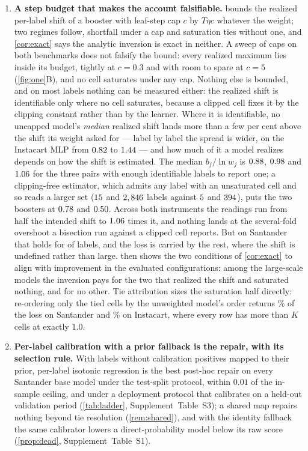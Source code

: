 \documentclass[sigconf,nonacm]{acmart}
\newcommand{\Supp}[1]{Supplement~#1}  %
\begin{document}
\begin{enumerate}[leftmargin=*,nosep]
\item \textbf{A step budget that makes the account falsifiable.}  bounds the realized per-label shift of a booster with leaf-step cap $c$ by $T\eta c$ whatever the weight; two regimes follow, shortfall under a cap and saturation ties without one, and \cref{cor:exact} says the analytic inversion is exact in neither. A sweep of \ncapN{} caps on both benchmarks does not falsify the bound: every realized maximum lies inside its budget, tightly at $c=0.3$ and with room to spare at $c=5$ (\cref{fig:one}B), and no cell saturates under any cap. Nothing else is bounded, and on most labels nothing can be measured either: the realized shift is identifiable only where no cell saturates, because a clipped cell fixes it by the clipping constant rather than by the learner. Where it is identifiable, no uncapped model's \emph{median} realized shift lands more than a few per cent above the shift its weight asked for --- label by label the spread is wider, on the Instacart MLP from $0.82$ to $1.44$ --- and how much of it a model realizes depends on how the shift is estimated. The median $b_j/\ln w_j$ is $0.88$, $0.98$ and $1.06$ for the three pairs with enough identifiable labels to report one; a clipping-free estimator, which admits any label with an unsaturated cell and so reads a larger set ($15$ and $2,846$ labels against $5$ and $394$), puts the two boosters at $0.78$ and $0.50$. Across both instruments the readings run from half the intended shift to $1.06$ times it, and nothing lands at the several-fold overshoot a bisection run against a clipped cell reports. But on Santander that holds for \nSnIdentShift{} of \nnLabels{} labels, and the loss is carried by the rest, where the shift is undefined rather than large.  then shows the two conditions of \cref{cor:exact} to align with improvement in the evaluated configurations: among the large-scale models the inversion pays for the two that realized the shift and saturated nothing, and for no other. Tie attribution sizes the saturation half directly: re-ordering only the tied cells by the unweighted model's order returns \ntieShareUnw\% of the loss on Santander and \nItieShareUnw\% on Instacart, where every row has more than $K$ cells at exactly $1.0$.
\item \textbf{Per-label calibration with a prior fallback is the repair, with its selection rule.} With labels without calibration positives mapped to their prior, per-label isotonic regression is the best post-hoc repair on every Santander base model under the test-split protocol, within $0.01$ of the in-sample ceiling, and under a deployment protocol that calibrates on a held-out validation period (\cref{tab:ladder}, \Supp{Table~S3}); a shared map repairs nothing beyond tie resolution (\cref{rem:shared}), and with the identity fallback the same calibrator lowers a direct-probability model below its raw score (\cref{prop:dead}, \Supp{Table~S1}).

\end{enumerate}
\end{document}
